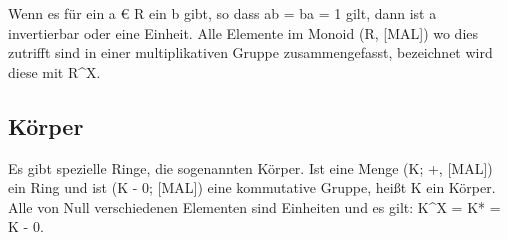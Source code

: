 			Wenn es für ein a € R ein b gibt, so dass ab = ba = 1 gilt, dann ist a invertierbar oder eine Einheit. Alle Elemente im Monoid (R, [MAL]) wo dies zutrifft sind in einer multiplikativen Gruppe zusammengefasst, bezeichnet wird diese mit R^X.~\cite[S.~58]{Erste:Hilfe:in:Linearer:Algebra}
			
		
		\subsection{Körper}
			Es gibt spezielle Ringe, die sogenannten Körper. Ist eine Menge (K; +, [MAL]) ein Ring und ist (K - {0}; [MAL]) eine kommutative Gruppe, heißt K ein Körper. Alle von Null verschiedenen Elementen sind Einheiten und es gilt: K^X = K* = K - {0}.~\cite[S.~60]{Erste:Hilfe:in:Linearer:Algebra}
			
			
